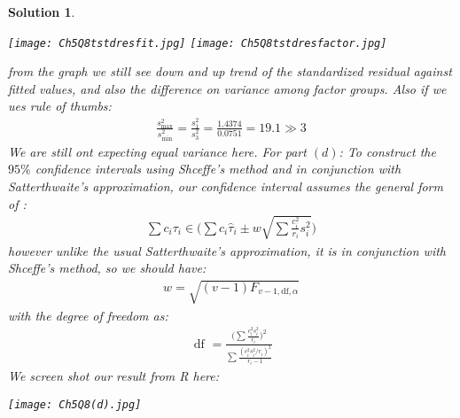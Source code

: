 \documentclass[11pt]{article}
\newtheorem{sol}{Solution}
\begin{document}
\begin{sol}
	\begin{center}
		\texttt{[image: Ch5Q8tstdresfit.jpg]}
		\texttt{[image: Ch5Q8tstdresfactor.jpg]}
	\end{center}
	from the graph we still see down and up trend of the standardized residual against fitted values, and also the difference on variance among factor groups.\vskip 2mm
	Also if we ues rule of thumbs:
	\begin{align*}
		\frac{s^2_{\max}}{s^2_{\min}} = \frac{s^2_{1}}{s^2_{3}} = \frac{1.4374}{0.0751} = 19.1 \gg 3
	\end{align*}
	We are still ont expecting equal variance here.\vskip 2mm
	For part $(d)$:\vskip 2mm
	To construct the $95\%$ confidence intervals using Shceffe's method and in conjunction with Satterthwaite's approximation, our confidence interval assumes the general form of :
	\begin{align*}
		\sum c_i\tau_i \in \Big(\sum c_i\hat{\tau}_i \pm w\sqrt{\sum\frac{c_i^2}{r_i}s_i^2}\Big)
	\end{align*}
	however unlike the usual Satterthwaite's approximation, it is in conjunction with Shceffe's method, so we should have:
	\begin{align*}
		w = \sqrt{(v - 1)F_{v - 1, \text{df}, \alpha}}
	\end{align*}
	with the degree of freedom as:
	\begin{align*}
		\text{ df } = \frac{\Big(\sum \frac{c_i^2s_i^2}{r_i}\Big)^2}{\sum \frac{(c_i^2s_i^2/r_i)^2}{r_i - 1}}
	\end{align*}
	We screen shot our result from R here:\vskip 2mm
	\begin{center}
		\texttt{[image: Ch5Q8(d).jpg]}
	\end{center}
\end{sol}
\end{document}
